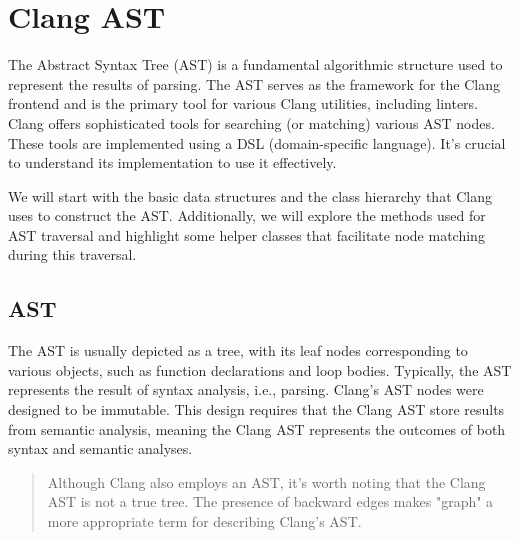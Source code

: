 \chapter{Clang AST}
The Abstract Syntax Tree (AST) is a fundamental algorithmic structure used to
represent the results of parsing. The AST serves as the framework for the Clang frontend and is the primary tool
for various Clang utilities, including linters. Clang offers sophisticated tools
for searching (or matching) various AST nodes. These tools are implemented using
a DSL (domain-specific language). It's crucial to understand its implementation
to use it effectively. 

We will start with the basic data structures and the class hierarchy that Clang
uses to construct the AST. Additionally, we will explore the methods used for
AST traversal and highlight some helper classes that facilitate node matching
during this traversal. 

\section{AST}
The AST is usually
depicted as a tree, with its leaf nodes corresponding to various objects, such
as function declarations and loop bodies. 
Typically, the AST represents the result of syntax analysis, i.e.,
parsing. Clang's AST nodes were designed to be immutable. This design requires
that the Clang AST store results from semantic analysis, meaning the Clang AST
represents the outcomes of both syntax and semantic analyses. 

\begin{quote}
Although Clang also
employs an AST, it's worth noting that the Clang AST is not a true tree. The
presence of backward edges makes "graph" a more appropriate term for describing
Clang's AST.
\end{quote}

